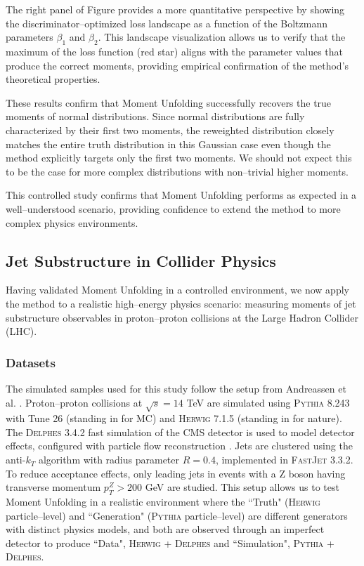             The right panel of Figure  provides a more quantitative perspective by showing the discriminator--optimized loss landscape as a function of the Boltzmann parameters $\beta_1$ and $\beta_2$.
            This landscape visualization allows us to verify that the maximum of the loss function (red star) aligns with the parameter values that produce the correct moments, providing empirical confirmation of the method's theoretical properties.

            These results confirm that Moment Unfolding successfully recovers the true moments of normal distributions.
            Since normal distributions are fully characterized by their first two moments, the reweighted distribution closely matches the entire truth distribution in this Gaussian case even though the method explicitly targets only the first two moments.
            We should not expect this to be the case for more complex distributions with non--trivial higher moments.

        This controlled study confirms that Moment Unfolding performs as expected in a well--understood scenario, providing confidence to extend the method to more complex physics environments.
    \subsection{Jet Substructure in Collider Physics}
    \label{subsec:jet-moments}
        Having validated Moment Unfolding in a controlled environment, we now apply the method to a realistic high--energy physics scenario: measuring moments of jet substructure observables in proton--proton collisions at the Large Hadron Collider (LHC).
        \subsubsection{Datasets}
            The simulated samples used for this study follow the setup from Andreassen et al. .
            Proton--proton collisions at $\sqrt{s} = 14$ TeV are simulated using \textsc{Pythia 8.243} with Tune 26  (standing in for MC) and \textsc{Herwig 7.1.5}  (standing in for nature).
            The \textsc{Delphes 3.4.2}  fast simulation of the CMS detector is used to model detector effects, configured with particle flow reconstruction .
            Jets are clustered using the anti-$k_T$ algorithm  with radius parameter $R = 0.4$, implemented in \textsc{FastJet 3.3.2}.
            To reduce acceptance effects, only leading jets in events with a Z boson having transverse momentum $p_T^Z > 200$ GeV are studied.
            This setup allows us to test Moment Unfolding in a realistic environment where the ``Truth" (\textsc{Herwig} particle--level) and ``Generation" (\textsc{Pythia} particle--level) are different generators with distinct physics models, and both are observed through an imperfect detector to produce ``Data", \textsc{Herwig + Delphes} and ``Simulation", \textsc{Pythia + Delphes}.
